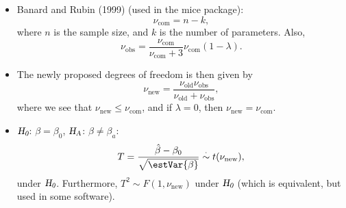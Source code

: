 \begin{enumerate}
\begin{itemize}
\begin{itemize}
                              \item Banard and Rubin (1999) (used in the mice package):
                                    \[ \nu_{\text{com}}=n-k, \]
                                    where $ n $ is the sample size, and $ k $ is the number of parameters. Also,
                                    \[ \nu_{\text{obs}}=\frac{\nu_{\text{com}}}{\nu_{\text{com}}+3}\nu_{\text{com}}(1-\lambda). \]
                              \item The newly proposed degrees of freedom is then given by
                                    \[ \nu_{\text{new}}=\frac{\nu_{\text{old}}\nu_{\text{obs}}}{\nu_{\text{old}}+\nu_{\text{obs}}}, \]
                                    where we see that $ \nu_{\text{new}}\le \nu_{\text{com}} $, and if $ \lambda=0 $, then $ \nu_{\text{new}}=\nu_{\text{com}} $.
                              \item $ \textsl{H}_{\textsl{0}} $: $ \beta=\beta_0 $, $ \textsl{H}_{\textsl{A}} $: $ \beta\ne \beta_a $:
                                    \[ T=\frac{\hat{\beta}-\beta_0}{\sqrt{\estVar{\beta}}}\stackrel{\cdot}{\sim}t(\nu_{\text{new}}),  \]
                                    under $ \textsl{H}_{\textsl{0}} $. Furthermore, $ T^2 \sim F(1,\nu_{\text{new}}) $ under $ \textsl{H}_{\textsl{0}} $
                                    (which is equivalent, but used in some software).
                        \end{itemize}
            \end{itemize}
\end{enumerate}